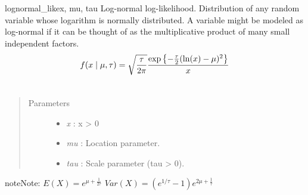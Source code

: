 \hypertarget{pymc.distributions.lognormal_like}{}\begin{funcdesc}{lognormal\_like}{x, mu, tau}
Log-normal log-likelihood. Distribution of any random variable whose
logarithm is normally distributed. A variable might be modeled as
log-normal if it can be thought of as the multiplicative product of many
small independent factors.
\begin{gather}
\begin{split}f(x \mid \mu, \tau) = \sqrt{\frac{\tau}{2\pi}}\frac{
\exp\left\{ -\frac{\tau}{2} (\ln(x)-\mu)^2 \right\}}{x}\end{split}\notag\\\begin{split}\end{split}\notag
\end{gather}\begin{quote}\begin{description}
\item[Parameters] \leavevmode\begin{itemize}
\item {} 
\emph{x} : x \textgreater{} 0

\item {} 
\emph{mu} : Location parameter.

\item {} 
\emph{tau} : Scale parameter (tau \textgreater{} 0).

\end{itemize}

\end{description}\end{quote}

\begin{notice}{note}{Note:}
$E(X)=e^{\mu+\frac{1}{2\tau}}$
$Var(X)=(e^{1/\tau}-1)e^{2\mu+\frac{1}{\tau}}$
\end{notice}
\end{funcdesc}

